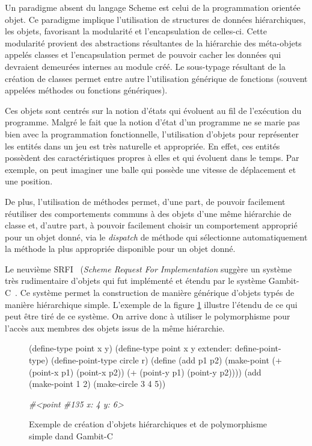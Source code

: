 \documentclass[12pt,oneside,letterpaper,francais]{book}
\newcommand{\schemeresult}[1]{{\it #1}}
\begin{document}
Un paradigme absent du langage Scheme est celui de la programmation
orientée objet. Ce paradigme implique l'utilisation de structures de
données hiérarchiques, les objets, favorisant la modularité et
l'encapsulation de celles-ci. Cette modularité provient des
abstractions résultantes de la hiérarchie des méta-objets appelés
classes et l'encapsulation permet de pouvoir cacher les données qui
devraient demeurées internes au module créé.  Le sous-typage résultant
de la création de classes permet entre autre l'utilisation générique
de fonctions (souvent appelées méthodes ou fonctions génériques).

Ces objets sont centrés sur la notion d'états qui évoluent au fil de
l'exécution du programme. Malgré le fait que la notion d'état d'un
programme ne se marie pas bien avec la programmation fonctionnelle,
l'utilisation d'objets pour représenter les entités dans un jeu est
très naturelle et appropriée. En effet, ces entités possèdent des
caractéristiques propres à elles et qui évoluent dans le temps. Par
exemple, on peut imaginer une balle qui possède une vitesse de
déplacement et une position. 

De plus, l'utilisation de méthodes permet, d'une part, de pouvoir
facilement réutiliser des comportements communs à des objets d'une
même hiérarchie de classe et, d'autre part, à pouvoir facilement
choisir un comportement approprié pour un objet donné, via le
\textit{dispatch} de méthode qui sélectionne automatiquement la
méthode la plus appropriée disponible pour un objet donné.

Le neuvième SRFI~\cite{SRFI_9} (\textit{Scheme Request For
  Implementation} suggère un système très rudimentaire d'objets qui
fut implémenté et étendu par le système Gambit-C~\cite{Gambit4}. Ce
système permet la construction de manière générique d'objets typés de
manière hiérarchique simple. L'exemple de la figure
\ref{OO:gambit-obj} illustre l'étendu de ce qui peut être tiré de ce
système. On arrive donc à utiliser le polymorphisme pour l'accès aux
membres des objets issus de la même hiérarchie.

\begin{figure}[htb!]
  \begin{schemecode}
(define-type point x y)
(define-type point x y extender: define-point-type)
(define-point-type circle r)
(define (add p1 p2) (make-point (+ (point-x p1) (point-x p2))
                                (+ (point-y p1) (point-y p2))))
(add (make-point 1 2) (make-circle 3 4 5))
  \end{schemecode}
  \schemeresult{\#\textless point \#135 x: 4 y: 6\textgreater}
  \caption{Exemple de création d'objets hiérarchiques et de
    polymorphisme simple dand Gambit-C}
  \label{OO:gambit-obj}
\end{figure}
\end{document}
